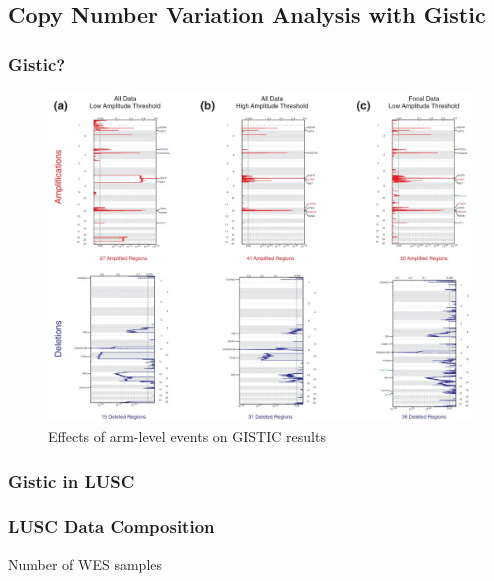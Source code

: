 \documentclass{beamer}
\begin{document}
    \subsection{Copy Number Variation Analysis with Gistic}
    \begin{frame}
        \frametitle{Gistic?}

        \begin{figure}
            \includegraphics[width=0.6 \linewidth]{figures/Workflow/Gistic.jpg}
            \caption{Effects of arm-level events on GISTIC results \protect\cite{gistic-1}}
        \end{figure}
    \end{frame}

    \subsubsection{Gistic in LUSC}
    \begin{frame}
        \frametitle{LUSC Data Composition}

        \begin{table}
            \caption{Number of WES samples}
            \resizebox{!}{0.3 \textheight}
            {}
        \end{table}
    \end{frame}
\end{document}
